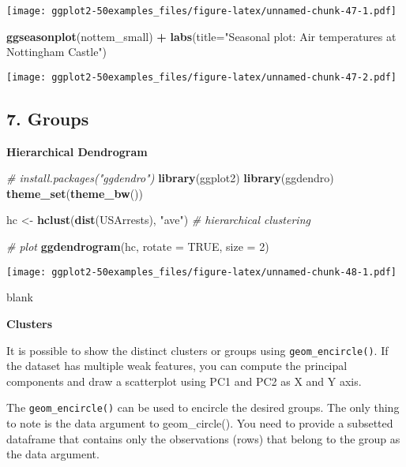\documentclass[a4paper]{article}
\newenvironment{Shaded}{\begin{snugshade}}{\end{snugshade}}
\newcommand{\KeywordTok}[1]{\textcolor[rgb]{0.13,0.29,0.53}{\textbf{#1}}}
\newcommand{\DataTypeTok}[1]{\textcolor[rgb]{0.13,0.29,0.53}{#1}}
\newcommand{\DecValTok}[1]{\textcolor[rgb]{0.00,0.00,0.81}{#1}}
\newcommand{\StringTok}[1]{\textcolor[rgb]{0.31,0.60,0.02}{#1}}
\newcommand{\CommentTok}[1]{\textcolor[rgb]{0.56,0.35,0.01}{\textit{#1}}}
\newcommand{\OtherTok}[1]{\textcolor[rgb]{0.56,0.35,0.01}{#1}}
\newcommand{\OperatorTok}[1]{\textcolor[rgb]{0.81,0.36,0.00}{\textbf{#1}}}
\newcommand{\NormalTok}[1]{#1}
\begin{document}
\texttt{[image: ggplot2-50examples\_files/figure-latex/unnamed-chunk-47-1.pdf]}

\begin{Shaded}
\begin{Highlighting}[]
\KeywordTok{ggseasonplot}\NormalTok{(nottem_small) }\OperatorTok{+}\StringTok{ }\KeywordTok{labs}\NormalTok{(}\DataTypeTok{title=}\StringTok{"Seasonal plot: Air temperatures at Nottingham Castle"}\NormalTok{)}
\end{Highlighting}
\end{Shaded}

\texttt{[image: ggplot2-50examples\_files/figure-latex/unnamed-chunk-47-2.pdf]}

\newpage

\subsection{7. Groups}\label{groups}

\textbf{Hierarchical Dendrogram}

\begin{Shaded}
\begin{Highlighting}[]
\CommentTok{# install.packages("ggdendro")}
\KeywordTok{library}\NormalTok{(ggplot2)}
\KeywordTok{library}\NormalTok{(ggdendro)}
\KeywordTok{theme_set}\NormalTok{(}\KeywordTok{theme_bw}\NormalTok{())}

\NormalTok{hc <-}\StringTok{ }\KeywordTok{hclust}\NormalTok{(}\KeywordTok{dist}\NormalTok{(USArrests), }\StringTok{"ave"}\NormalTok{)  }\CommentTok{# hierarchical clustering}

\CommentTok{# plot}
\KeywordTok{ggdendrogram}\NormalTok{(hc, }\DataTypeTok{rotate =} \OtherTok{TRUE}\NormalTok{, }\DataTypeTok{size =} \DecValTok{2}\NormalTok{)}
\end{Highlighting}
\end{Shaded}

\texttt{[image: ggplot2-50examples\_files/figure-latex/unnamed-chunk-48-1.pdf]}

\newpage

blank

\newpage

\textbf{Clusters}

It is possible to show the distinct clusters or groups using
\texttt{geom\_encircle()}. If the dataset has multiple weak features,
you can compute the principal components and draw a scatterplot using
PC1 and PC2 as X and Y axis.

The \texttt{geom\_encircle()} can be used to encircle the desired
groups. The only thing to note is the data argument to geom\_circle().
You need to provide a subsetted dataframe that contains only the
observations (rows) that belong to the group as the data argument.
\end{document}
